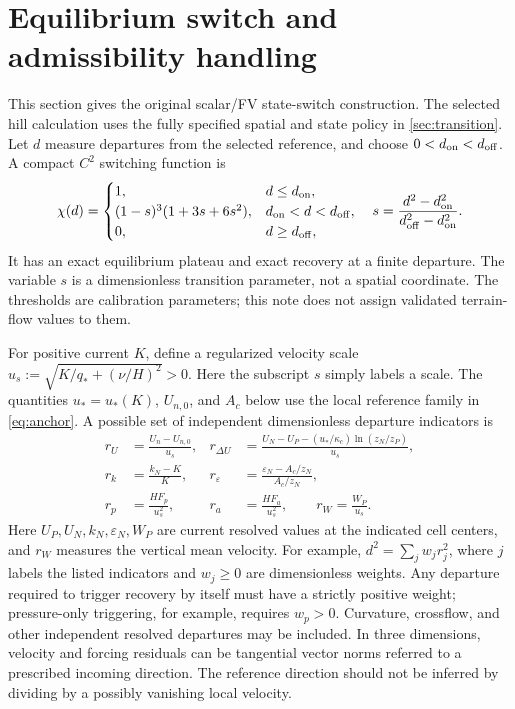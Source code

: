 \documentclass[11pt,a4paper]{article}
\numberwithin{equation}{section}
\newcommand{\eps}{\varepsilon}
\newcommand{\ust}{u_*}
\newcommand{\kc}{\kappa_c}
\newcommand{\qs}{q_*}
\newcommand{\Aref}{A_c}
\begin{document}
\section{Equilibrium switch and admissibility handling}
\label{sec:switch}
This section gives the original scalar/FV state-switch construction.
The selected hill calculation uses the fully specified spatial and
state policy in \cref{sec:transition}.
Let $d$ measure departures from the selected reference, and choose
$0<d_{\rm on}<d_{\rm off}$. A compact $C^2$ switching function is
\begin{equation}
\chi(d)=
\begin{cases}
1,&d\leq d_{\rm on},\\
(1-s)^3(1+3s+6s^2),&d_{\rm on}<d<d_{\rm off},\\
0,&d\geq d_{\rm off},
\end{cases}
\quad
s=\frac{d^2-d_{\rm on}^2}{d_{\rm off}^2-d_{\rm on}^2}.
\label{eq:switch}
\end{equation}
It has an exact equilibrium plateau and exact recovery at a finite
departure. The variable $s$ is a dimensionless transition parameter, not a spatial
coordinate. The thresholds are calibration parameters; this note does
not assign validated terrain-flow values to them.

For positive current $K$, define a regularized velocity scale
$u_s:=\sqrt{K/\qs+(\nu/H)^2}>0$. Here the subscript $s$ simply
labels a scale. The quantities $\ust=\ust(K)$, $U_{n,0}$, and
$\Aref$ below use the local reference family in \cref{eq:anchor}.
A possible set of independent dimensionless departure indicators is
\begin{align}
r_U&=\frac{U_n-U_{n,0}}{u_s},
&
r_{\Delta U}
 &=\frac{U_N-U_P-(\ust/\kc)\ln(z_N/z_P)}{u_s},
\nonumber\\
r_k&=\frac{k_N-K}{K},
&
r_\eps&=\frac{\eps_N-\Aref/z_N}{\Aref/z_N},
\nonumber\\
r_p&=\frac{HF_p}{u_s^2},
&
r_a&=\frac{HF_a}{u_s^2},
\qquad
r_W=\frac{W_P}{u_s}.
\label{eq:sensors}
\end{align}
Here $U_P,U_N,k_N,\eps_N,W_P$ are current resolved values at the
indicated cell centers, and $r_W$ measures the vertical mean velocity.
For example, $d^2=\sum_jw_jr_j^2$, where $j$ labels the listed
indicators and $w_j\geq0$ are dimensionless weights.
Any departure required to trigger recovery by itself must have a
strictly positive weight; pressure-only triggering, for example,
requires $w_p>0$.
Curvature, crossflow, and other independent resolved departures may be
included. In three dimensions, velocity and forcing residuals can be
tangential vector norms referred to a prescribed incoming direction.
The reference direction should not be inferred by dividing by a possibly
vanishing local velocity.
\end{document}
